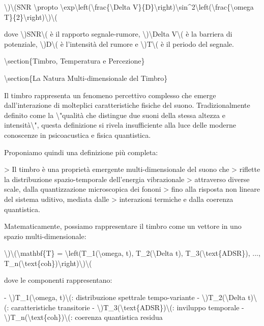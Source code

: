 \documentclass[a4paper,11pt]{article}
\begin{document}
\textbackslash{})\textbackslash{}(SNR \textbackslash{}propto \textbackslash{}exp\textbackslash{}left(\textbackslash{}frac\{\textbackslash{}Delta V\}\{D\}\textbackslash{}right)\textbackslash{}sin\textasciicircum{}2\textbackslash{}left(\textbackslash{}frac\{\textbackslash{}omega T\}\{2\}\textbackslash{}right)\textbackslash{})\textbackslash{}(

dove \textbackslash{})SNR\textbackslash{}( \`e il rapporto segnale-rumore, \textbackslash{})\textbackslash{}Delta V\textbackslash{}( \`e la barriera di
potenziale, \textbackslash{})D\textbackslash{}( \`e l'intensit\`a del rumore e \textbackslash{})T\textbackslash{}( \`e il periodo del segnale.

\textbackslash{}section\{Timbro, Temperatura e Percezione\}

\textbackslash{}section\{La Natura Multi-dimensionale del Timbro\}

Il timbro rappresenta un fenomeno percettivo complesso che emerge
dall'interazione di molteplici caratteristiche fisiche del suono.
Tradizionalmente definito come la \textbackslash{}"qualit\`a che distingue due suoni
della stessa altezza e intensit\`a\textbackslash{}", questa definizione si rivela
insufficiente alla luce delle moderne conoscenze in psicoacustica e
fisica quantistica.

Proponiamo quindi una definizione pi\`u completa:

> Il timbro \`e una propriet\`a emergente multi-dimensionale del suono che
> riflette la distribuzione spazio-temporale dell'energia vibrazionale
> attraverso diverse scale, dalla quantizzazione microscopica dei fononi
> fino alla risposta non lineare del sistema uditivo, mediata dalle
> interazioni termiche e dalla coerenza quantistica.

Matematicamente, possiamo rappresentare il timbro come un vettore in uno
spazio multi-dimensionale:

\textbackslash{})\textbackslash{}(\textbackslash{}mathbf\{T\} = \textbackslash{}left(T\_1(\textbackslash{}omega, t), T\_2(\textbackslash{}Delta t), T\_3(\textbackslash{}text\{ADSR\}), ..., T\_n(\textbackslash{}text\{coh\})\textbackslash{}right)\textbackslash{})\textbackslash{}(

dove le componenti rappresentano:

- \textbackslash{})T\_1(\textbackslash{}omega, t)\textbackslash{}(: distribuzione spettrale tempo-variante
- \textbackslash{})T\_2(\textbackslash{}Delta t)\textbackslash{}(: caratteristiche transitorie
- \textbackslash{})T\_3(\textbackslash{}text\{ADSR\})\textbackslash{}(: inviluppo temporale
- \textbackslash{})T\_n(\textbackslash{}text\{coh\})\textbackslash{}(: coerenza quantistica residua
\end{document}
